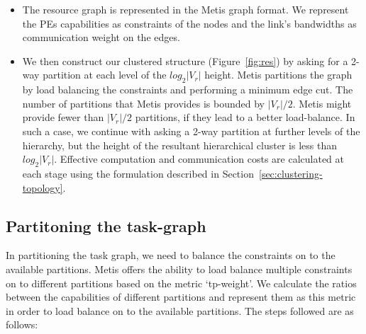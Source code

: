 \begin{itemize}


\item The resource graph is represented in the Metis graph format. We
  represent the PEs capabilities as constraints of the nodes and the
  link's bandwidths as communication weight on the edges.

\item We then construct our clustered structure (Figure~\ref{fig:res})
  by asking for a 2-way partition at each level of the $log_2|V_r|$
  height. Metis partitions the graph by load balancing the constraints
  and performing a minimum edge cut. The number of partitions that Metis
  provides is bounded by $|V_r|/2$. Metis might provide fewer than
  $|V_r|/2$ partitions, if they lead to a better load-balance. In such a
  case, we continue with asking a 2-way partition at further levels of
  the hierarchy, but the height of the resultant hierarchical cluster is
  less than $log_2|V_r|$. Effective computation and communication costs
  are calculated at each stage using the formulation described in
  Section~\ref{sec:clustering-topology}.

\end{itemize}

\subsection{Partitoning the task-graph}
\label{sec:part-task-graph}

In partitioning the task graph, we need to balance the constraints on to
the available partitions. Metis offers the ability to load balance
multiple constraints on to different partitions based on the metric
\mbox{`tp-weight'}. We calculate the ratios between the capabilities of
different partitions and represent them as this metric in order to load
balance on to the available partitions. The steps followed are as
follows:

